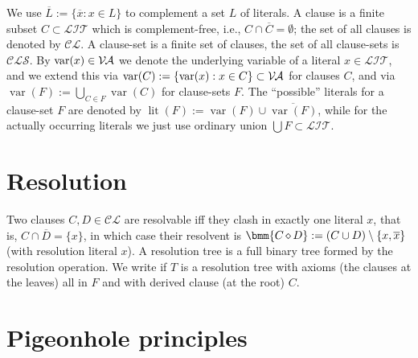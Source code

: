 \documentclass{report}
\newcommand{\set}[1]{\{ #1 \}}
\newcommand{\ol}{\overline}
\newcommand{\es}{\emptyset}
\newcommand{\sm}{\setminus}
\newcommand{\bc}{\bigcup}
\newcommand{\mc}{\mathcal}
\newcommand{\Va}{\mc{V\hspace{-0.1em}A}}
\newcommand{\Lit}{\mc{LIT}}
\newcommand{\Cl}{\mc{CL}}
\newcommand{\Cls}{\mc{CLS}}
\DeclareMathOperator{\lit}{lit}
\DeclareMathOperator{\var}{var}
\DeclareMathOperator{\res}{\diamond} %
\begin{document}
We use $\ol{L} := \set{\ol{x} : x \in L}$ to complement a set $L$ of literals. A clause is a finite subset $C \subset \Lit$ which is complement-free, i.e., $C \cap \ol{C} = \es$; the set of all clauses is denoted by $\Cl$. A clause-set is a finite set of clauses, the set of all clause-sets is $\Cls$. By $\var(x) \in \Va$ we denote the underlying variable of a literal $x \in \Lit$, and we extend this via $\var(C) := \set{\var(x) : x \in C} \subset \Va$ for clauses $C$, and via $\var(F) := \bc_{C \in F} \var(C)$ for clause-sets $F$. The ``possible'' literals for a clause-set $F$ are denoted by $\lit(F) := \var(F) \cup \ol{\var(F)}$, while for the actually occurring literals we just use ordinary union $\bc F \subset \Lit$.


\section{Resolution}
\label{sec:Resolution}

Two clauses $C, D \in \Cl$ are resolvable iff they clash in exactly one literal $x$, that is, $C \cap \ol{D} = \set{x}$, in which case their resolvent is $\bmm{C \res D} := (C \cup D) \sm \set{x,\ol{x}}$ (with resolution literal $x$). A resolution tree is a full binary tree formed by the resolution operation. We write  if $T$ is a resolution tree with axioms (the clauses at the leaves) all in $F$ and with derived clause (at the root) $C$.


\section{Pigeonhole principles}
\label{sec:php}
\end{document}
